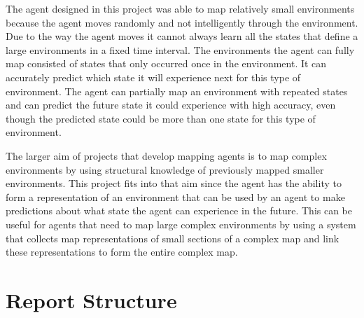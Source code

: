 The agent designed in this project was able to map relatively small environments because the agent moves randomly and not intelligently through the environment. Due to the way the agent moves it cannot always learn all the states that define a large environments in a fixed time interval. The environments the agent can fully map consisted of states that only occurred once in the environment. It can accurately predict which state it will experience next for this type of environment. The agent can partially map an environment with repeated states and can predict the future state it could experience with high accuracy, even though the predicted state could be more than one state for this type of environment.

The larger aim of projects that develop mapping agents is to map complex environments by using structural knowledge of previously mapped smaller environments. This project fits into that aim since the agent has the ability to form a representation of an environment that can be used by an agent to make predictions about what state the agent can experience in the future. This can be useful for agents that need to map large complex environments by using a system that collects map representations of small sections of a complex map and link these representations to form the entire complex map.

%
%





\section{Report Structure}

%


